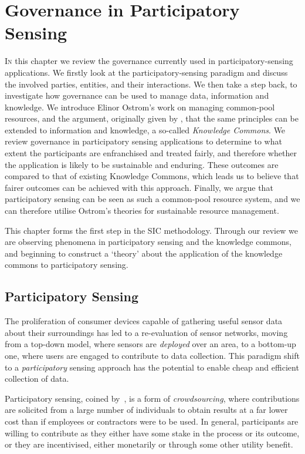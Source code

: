 \acresetall
\chapter{Governance in Participatory Sensing}\label{ch:kc}

\lettrine[lines=3]{I}{n} this chapter we review the governance currently used in 
participatory-sensing applications. We firstly look at the participatory-sensing paradigm
and discuss the involved parties, entities, and their interactions. We then
take a step back, to investigate how governance can be used to manage data,
information and knowledge. We introduce Elinor Ostrom's work on managing
common-pool resources, and the argument, originally given by
\citet{Ostrom2003}, that the same principles can be extended to information
and knowledge, a so-called \emph{Knowledge Commons}. We review governance in participatory sensing
applications to determine to what extent the participants are enfranchised and
treated fairly, and therefore whether the application is likely to be
sustainable and enduring. These outcomes are compared to that of existing
Knowledge Commons, which leads us to believe that fairer outcomes can be
achieved with this approach. Finally, we argue that
participatory sensing can be seen as such a common-pool resource system, and we can
therefore utilise Ostrom's theories for sustainable resource
management. 

This chapter forms the first step in the \ac{SIC} methodology. Through our
review we are observing phenomena in participatory sensing and the knowledge
commons, and beginning to construct a `theory' about the application of the
knowledge commons to participatory sensing.

\section{Participatory Sensing}\label{sec:psense}

The proliferation of consumer devices capable of gathering useful sensor data
about their surroundings has led to a re-evaluation of sensor networks, moving
from a top-down model, where sensors are \emph{deployed} over an area, to a
bottom-up one, where users are engaged to contribute to data collection. This
paradigm shift to a \emph{participatory} sensing approach has the potential to
enable cheap and efficient collection of data.

Participatory sensing, coined by~\citet{Burke2006}, is a form of
\emph{crowdsourcing}, where contributions are solicited from a large number of
individuals to obtain results at a far lower cost than if employees or
contractors were to be used. In general, participants are willing to
contribute as they either have some stake in the process or its outcome, or
they are incentivised, either monetarily or through some other utility
benefit.

